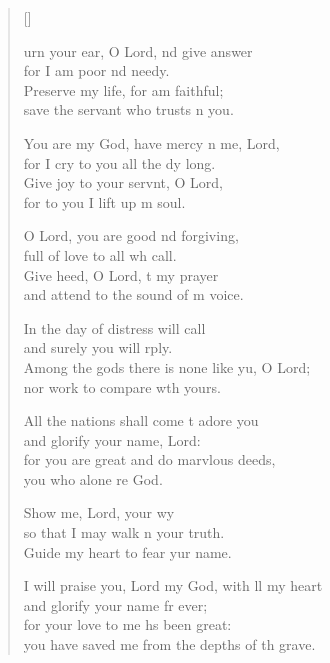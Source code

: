 \settowidth{\versewidth}{I will praise you, Lord my God, with all my heart *}
\begin{verse}[\versewidth]
  \begin{patverse}
urn your ear, O Lord, nd give answer\Med\\
for I am poor nd needy.\\
Preserve my life, for  am faithful;\Med\\
save the servant who trusts \pointup{\i}n you.

You are my God, have mercy n me, Lord,\Med\\
for I cry to you all the dy long.\\
Give joy to your servnt, O Lord,\Med\\
for to you I lift up m soul.

O Lord, you are good nd forgiving,\Med\\
full of love to all wh call.\\
Give heed, O Lord, t my prayer\Med\\
and attend to the sound of m voice.

In the day of distress  will call\Med\\
and surely you will rply.\\
Among the gods there is none like yu, O Lord;\Med\\
nor work to compare w\pointup{\i}th yours.

All the nations shall come t adore you\Med\\
and glorify your name,  Lord:\\
for you are great and do marvlous deeds,\Med\\
you who alone re God.

Show me, Lord, your wy\Flex\\
so that I may walk n your truth.\Med\\
Guide my heart to fear yur name.

I will praise you, Lord my God, with ll my heart\Med\\
and glorify your name fr ever;\\
for your love to me hs been great:\Med\\
you have saved me from the depths of th grave.


\end{patverse}
\end{verse}
